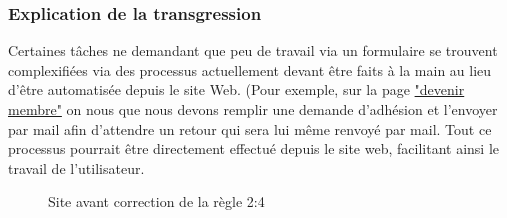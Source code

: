 \documentclass{article}[12pt]
\begin{document}
    \subsubsection*{Explication de la transgression}
    Certaines tâches ne demandant que peu de travail via un formulaire se trouvent complexifiées via des processus actuellement devant être faits à la main au lieu d'être automatisée depuis le site Web. (Pour exemple, sur la page \href{http://www.tennisclubdeparis.fr/formule-adhesion.html}{"devenir membre"} on nous que nous devons remplir une demande d'adhésion et l'envoyer par mail afin d'attendre un retour qui sera lui même renvoyé par mail. Tout ce processus pourrait être directement effectué depuis le site web, facilitant ainsi le travail de l'utilisateur.
     \begin{figure}[H]
    	\centering
        \caption{Site avant correction de la règle 2:4}
    \end{figure}
\end{document}
